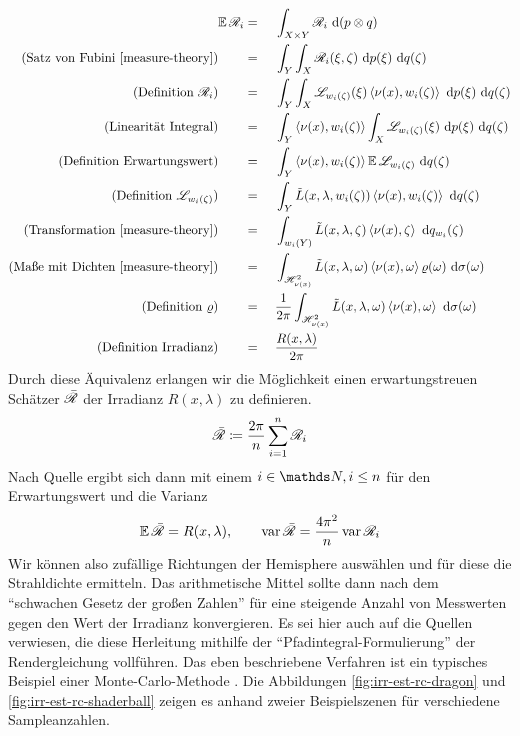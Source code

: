 		\begin{alignat*}{3}
			\expect \e{R}_i &=&&\ \integral{X\times Y}{}{\e{R}_i}{(p\otimes q)} \\
			\text{(Satz von Fubini \cite[S.~175~f]{measure-theory})}\qquad &=&&\ \integral{Y}{}{ \integral{X}{}{ \e{R}_i(\xi,\zeta) }{p(\xi)} }{q(\zeta)} \\
			\text{(Definition $\e{R}_i$)}\qquad &=&&\ \integral{Y}{}{ \integral{X}{}{ \e{L}_{w_i(\zeta)}(\xi) \dotp{\nu(x)}{w_i(\zeta)} }{p(\xi)} }{q(\zeta)} \\
			\text{(Linearität Integral)}\qquad &=&&\ \integral{Y}{}{ \dotp{\nu(x)}{w_i(\zeta)} \integral{X}{}{ \e{L}_{w_i(\zeta)}(\xi)  }{p(\xi)} }{q(\zeta)} \\
			\text{(Definition Erwartungswert)}\qquad&=&&\ \integral{Y}{}{ \dotp{\nu(x)}{w_i(\zeta)}\expect \e{L}_{w_i(\zeta)} }{q(\zeta)} \\
			\text{(Definition $\e{L}_{w_i(\zeta)}$)}\qquad&=&&\ \integral{Y}{}{ \tilde{L}(x,\lambda,w_i(\zeta)) \dotp{\nu(x)}{w_i(\zeta)}}{q(\zeta)} \\
			\text{(Transformation \cite[S.~191~f]{measure-theory})}\qquad &=&&\ \integral{w_i(Y)}{}{ \tilde{L}(x,\lambda,\zeta) \dotp{\nu(x)}{\zeta}}{q_{w_i}(\zeta)} \\
			\text{(Maße mit Dichten \cite[S.~127~f]{measure-theory})}\qquad &=&&\ \integral{\shs{\nu(x)}}{}{\tilde{L}(x,\lambda,\omega)\dotp{\nu(x)}{\omega}\varrho(\omega)}{\sigma(\omega)} \\
			\text{(Definition $\varrho$)}\qquad&=&&\ \frac{1}{2\pi} \integral{\shs{\nu(x)}}{}{\tilde{L}(x,\lambda,\omega)\dotp{\nu(x)}{\omega}}{\sigma(\omega)} \\
			\text{(Definition Irradianz)}\qquad&=&&\ \frac{R(x,\lambda)}{2\pi}
		\end{alignat*}
		Durch diese Äquivalenz erlangen wir die Möglichkeit einen erwartungstreuen Schätzer $\bar{\mathscr{R}}$ der Irradianz $R(x,\lambda)$ zu definieren.
		\[
			\bar{\mathscr{R}} \coloneqq \frac{2\pi}{n}\sum_{i=1}^n \mathscr{R}_i
		\]
		Nach Quelle \cite[S.~249~ff]{prob-theory} ergibt sich dann mit einem $i\in\SN,i\leq n$ für den Erwartungswert und die Varianz
		\[
			\operatorname{\mathbb{E}} \bar{\mathscr{R}} = R(x,\lambda),\qquad \operatorname{var} \bar{\mathscr{R}} = \frac{4\pi^2}{n}\operatorname{var} \mathscr{R}_i
		\]
		Wir können also zufällige Richtungen der Hemisphere auswählen und für diese die Strahldichte ermitteln.
		Das arithmetische Mittel sollte dann nach dem \enquote{schwachen Gesetz der großen Zahlen} \cite[S.~254]{prob-theory} für eine steigende Anzahl von Messwerten gegen den Wert der Irradianz konvergieren.
		Es sei hier auch auf die Quellen \cite{kajiya-lte,pbrt3,veach-thesis} verwiesen, die diese Herleitung mithilfe der \enquote{Pfadintegral-Formulierung} der Rendergleichung vollführen.
		Das eben beschriebene Verfahren ist ein typisches Beispiel einer Monte-Carlo-Methode \cite{monte-carlo-method}.
		Die Abbildungen \ref{fig:irr-est-rc-dragon} und \ref{fig:irr-est-rc-shaderball} zeigen es anhand zweier Beispielszenen für verschiedene Sampleanzahlen.

